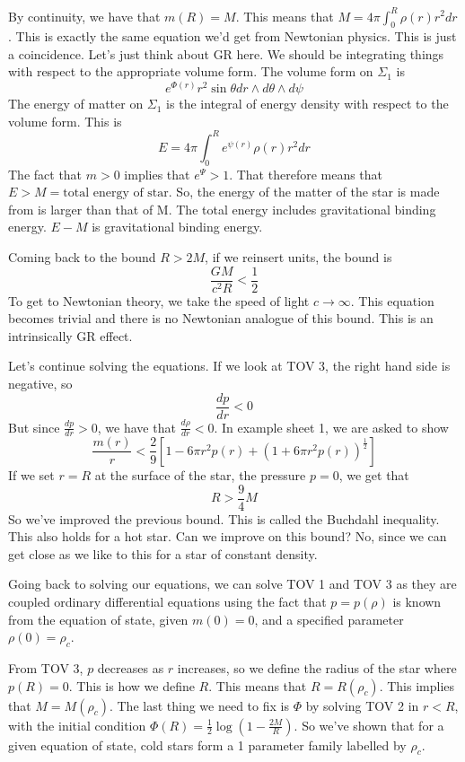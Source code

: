 \documentclass[11pt, oneside]{article}   	%
\theoremstyle{slanted}
\begin{document}
By continuity, 
we have that $ m ( R ) = M  $. This means 
that $ M = 4 \pi \int_ 0 ^ R \rho ( r ) r ^ 2 dr $. 
This is exactly the same equation we'd get from Newtonian physics. 
This is just a coincidence. 
Let's just think about GR here. 
We should be integrating things with respect to the 
appropriate volume form. 
The volume form on $ \Sigma _ 1 $ is 
\[
e^{ \Phi ( r ) } r ^2 \sin \theta dr \wedge  d \theta \wedge  d \psi 
\] The energy of matter on $ \Sigma _ 1 $ is the integral 
of energy density with respect to the volume form. 
This is 
\[
E = 4 \pi \int_ 0 ^ R e ^{ \psi ( r ) } \rho ( r ) r ^ 2 dr 
\] The fact that $ m > 0 $ implies that $ e ^{ \Psi  } > 1 $. 
That therefore means that $ E > M  = \text{total energy of star}$. 
So, the energy of the matter of the star is made from 
is larger than that of M. The total energy includes gravitational 
binding energy. $ E -  M $ is gravitational binding energy. 

Coming back to the bound $ R > 2M $, if we reinsert units, 
the bound is 
\[
\frac{ G M }{ c ^2 R } < \frac{1}{ 2}
\] To get to Newtonian theory, we take the speed of light $ c \to \infty $. 
This equation becomes trivial and there is no Newtonian analogue of 
this bound. This is an intrinsically GR effect. 

Let's continue solving the equations. 
If we look at TOV 3, 
the right hand side is negative, so 
\[
\frac{ dp }{ dr } < 0 
\] But since $ \frac{dp}{dr } > 0 $, we have that $ \frac{ d \rho }{ dr  } < 0 $. 
In example sheet 1, we are asked to show 
\[
\frac{m ( r ) }{ r } < \frac{2}{9 } \left[  
1 - 6 \pi r ^ 2 p ( r ) + \left(  1 + 6 \pi r ^2 p ( r )  \right)  ^{ \frac{1}{2 } }\right] 
\] If we set $ r  = R $ at the surface of the star, 
the pressure $ p = 0 $, we get that 
\[
R > \frac{9}{4 } M 
\] So we've improved the previous bound. This 
is called the Buchdahl inequality.
This also holds for a hot star. 
Can we improve on this bound? No, since we 
can get close as we like to this for a star of constant 
density. 

Going back to solving our equations, 
we can solve TOV 1 and TOV 3 as they 
are coupled ordinary differential equations 
using the fact that $ p = p (\rho ) $ is known 
from the equation of state, given $ m ( 0 ) = 0 $, 
and a specified parameter $ \rho ( 0 )  = \rho _ c $. 

From TOV 3, $ p $ decreases as $ r $ increases, 
so we define the radius of the star where $ p ( R )  = 0$. 
This is how we define $ R $. This means that $ R =  R( \rho _ c ) $. 
This implies that $ M = M ( \rho _ c )$. 
The last thing we need to fix is $ \Phi $ by solving TOV 2 
in $ r < R $, with the initial condition 
$ \Phi ( R )  = \frac{1}{2 } \log \left( 1 - \frac{2M}{R }  \right)  $. 
So we've shown that for a given equation of state, 
cold stars form a 1 parameter family labelled by $ \rho _ c $. 
\end{document}
